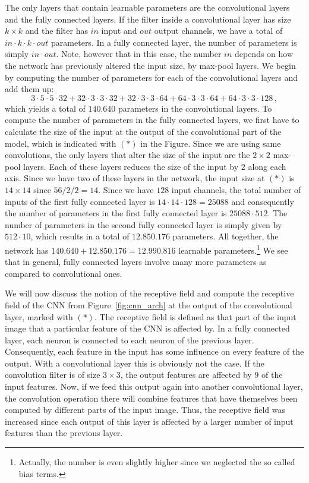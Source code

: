 The only layers that contain learnable parameters are the convolutional layers
and the fully connected layers. If the filter inside a convolutional layer has
size $k \times k$ and the filter has $in$ input and $out$ output channels, we
have a total of $in \cdot k \cdot k \cdot out$ parameters. In a fully connected
layer, the number of parameters is simply $in \cdot out$. Note, however that in
this case, the number $in$ depends on how the network has previously altered the
input size, \eg by max-pool layers. We begin by computing the number of
parameters for each of the convolutional layers and add them up:
\begin{equation*}
  3 \cdot 5 \cdot 5 \cdot 32 + 32 \cdot 3 \cdot 3 \cdot 32 + 32 \cdot 3 \cdot 3 \cdot 64 + 64 \cdot 3 \cdot 3 \cdot 64 + 64 \cdot 3 \cdot 3 \cdot 128\,,
\end{equation*}
which yields a total of $140.640$ parameters in the convolutional layers. To
compute the number of parameters in the fully connected layers, we first have to
calculate the size of the input at the output of the convolutional part of the
model, which is indicated with $(\ast)$ in the Figure. Since we are using same
convolutions, the only layers that alter the size of the input are the
$2 \times 2$ max-pool layers. Each of these layers reduces the size of the input
by $2$ along each axis. Since we have two of these layers in the network, the
input size at $(\ast)$ is $14 \times 14$ since $56 / 2 / 2 = 14$. Since we have
$128$ input channels, the total number of inputs of the first fully connected
layer is $14 \cdot 14 \cdot 128 = 25088$ and consequently the number of
parameters in the first fully connected layer is $25088 \cdot 512$. The number
of parameters in the second fully connected layer is simply given by
$512 \cdot 10$, which results in a total of $12.850.176$ parameters. All
together, the network has $140.640 + 12.850.176 = 12.990.816$ learnable
parameters.\footnote{Actually, the number is even slightly higher since we
  neglected the so called bias terms.} We see that in general, fully connected
layers involve many more parameters as compared to convolutional ones.

We will now discuss the notion of the receptive field and compute the receptive
field of the CNN from Figure~\ref{fig:cnn_arch} at the output of the
convolutional layer, marked with $(\ast)$. The receptive field is defined as
that part of the input image that a particular feature of the CNN is affected
by. In a fully connected layer, each neuron is connected to each neuron of the
previous layer. Consequently, each feature in the input has some influence on
every feature of the output. With a convolutional layer this is obviously not
the case. If the convolution filter is of size $3 \times 3$, the output features
are affected by $9$ of the input features. Now, if we feed this output again
into another convolutional layer, the convolution operation there will combine
features that have themselves been computed by different parts of the input
image. Thus, the receptive field was increased since each output of this layer
is affected by a larger number of input features than the previous layer.

